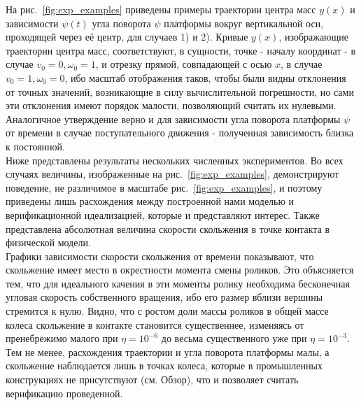 На рис.~\ref{fig:exp_examples} приведены примеры траектории центра масс $y(x)$ и зависимости $\psi(t)$ угла поворота $\psi$ платформы вокруг вертикальной оси, проходящей через её центр, для случаев 1) и 2). Кривые $y(x)$, изображающие траектории центра масс, соответствуют, в сущности, точке - началу координат - в случае $v_0 = 0, \omega_0 = 1$, и отрезку прямой, совпадающей с осью $x$, в случае $v_0 = 1, \omega_0 = 0$, ибо масштаб отображения таков, чтобы были видны отклонения от точных значений, возникающие в силу вычислительной погрешности, но сами эти отклонения имеют порядок малости, позволяющий считать их нулевыми. Аналогичное утверждение верно и для зависимости угла поворота платформы $\psi$ от времени в случае поступательного движения - полученная зависимость близка к постоянной.\\

Ниже представлены результаты нескольких численных экспериментов. Во всех случаях величины, изображенные на рис.~\ref{fig:exp_examples}, демонстрируют поведение, не различимое в масштабе рис.~\ref{fig:exp_examples}, и поэтому приведены лишь расхождения между построенной нами моделью и верификационной идеализацией, которые и представляют интерес. Также представлена абсолютная величина скорости скольжения в точке контакта в физической модели.\\

Графики зависимости скорости скольжения от времени показывают, что скольжение имеет место в окрестности момента смены роликов. Это объясняется тем, что для идеального качения в эти моменты ролику необходима бесконечная угловая скорость собственного вращения, ибо его размер вблизи вершины стремится к нулю. Видно, что с ростом доли массы роликов в общей массе колеса скольжение в контакте становится существеннее, изменяясь от пренебрежимо малого при $\eta = 10^{-6}$ до весьма существенного уже при $\eta = 10^{-3}$. Тем не менее, расхождения траектории и угла поворота платформы малы, а скольжение наблюдается лишь в точках колеса, которые в промышленных конструкциях не присутствуют (см. Обзор), что и позволяет считать верификацию проведенной.
\newpage


